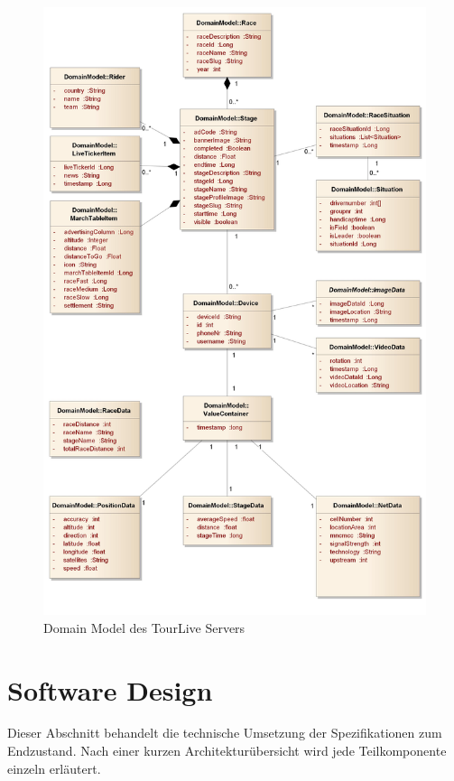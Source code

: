 \begin{figure}[H]
	\centering
	\includegraphics[width=140mm]{images/tourliveweb/TourLiveServer_DomainModel_ohneRand.jpg}
	\caption{Domain Model des TourLive Servers}
	\label{fig:tourliveserverdomainmodel}
\end{figure}
\newpage

\section{Software Design}
\label{sec:tourliveserversoftwaredesign}
Dieser Abschnitt behandelt die technische Umsetzung der Spezifikationen zum Endzustand. Nach einer kurzen Architekturübersicht wird jede Teilkomponente einzeln erläutert.

